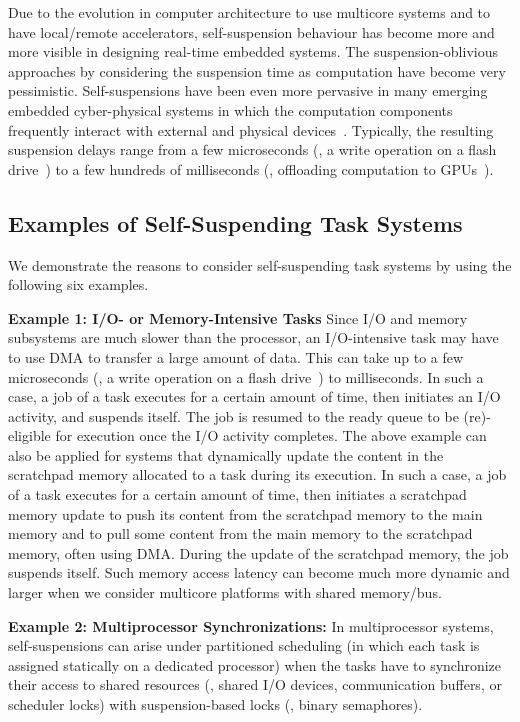 Due to the evolution in computer architecture to use multicore systems and to have local/remote accelerators, self-suspension behaviour has become more and more visible in designing real-time embedded systems.  The suspension-oblivious approaches by considering the suspension time as computation have become very pessimistic. Self-suspensions have been even more pervasive in many emerging embedded cyber-physical systems in which the computation components frequently interact with external and physical devices~\cite{Kang:rtss07,Kato_2011}.  Typically, the resulting suspension delays range from a few microseconds (\eg, a write operation on a flash drive~\cite{Kang:rtss07}) to a few hundreds of milliseconds (\eg, offloading computation to GPUs~\cite{Kato_2011,Liu_2014}). 

\subsection{Examples of Self-Suspending Task Systems}
\label{sec:examples}

We demonstrate the reasons to consider self-suspending task systems by using the following six examples.

{\bf Example 1: I/O- or Memory-Intensive Tasks} Since I/O and memory subsystems are much slower than the processor, an I/O-intensive task may have to use DMA to transfer a large amount of data. This can take up to a few microseconds (\eg, a write operation on a flash drive~\cite{Kang:rtss07}) to milliseconds. In such a case, a job of a task executes for a certain amount of time, then initiates an I/O activity, and suspends itself. The job is resumed to the ready queue to be (re)-eligible for execution once the I/O activity completes. The above example can also be applied for systems that dynamically update the content in the scratchpad memory allocated to a task during its execution. In such a case, a job of a task executes for a certain amount of time, then initiates a scratchpad memory update to push its content from the scratchpad memory to the main memory and to pull some content from the main memory to the scratchpad memory, often using DMA. During the update of the scratchpad memory, the job suspends itself. Such memory access latency can become much more dynamic and larger when we consider multicore platforms with shared memory/bus.

{\bf Example 2: Multiprocessor Synchronizations:} \hspace{0.1in}
In multiprocessor systems, self-suspensions can arise under partitioned scheduling (in which each task is assigned statically on a dedicated processor) when the tasks have to synchronize their access to shared resources (\eg, shared I/O devices, communication buffers, or scheduler locks) with suspension-based locks (\eg, binary semaphores). 


